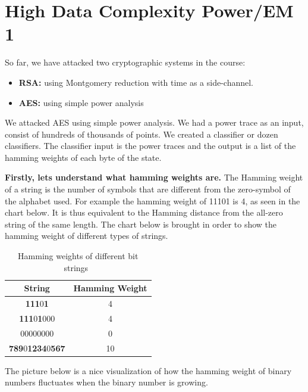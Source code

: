 \chapter{High Data Complexity Power/EM 1} \label{cha:High Data Complexity Power/EM 1}

So far, we have attacked two cryptographic systems in the course:
\begin{itemize}
    \item \textbf{RSA:} using Montgomery reduction with time as a side-channel.
    \item \textbf{AES:} using simple power analysis
\end{itemize}

We attacked AES using simple power analysis.
We had a power trace as an input, consist of hundreds of thousands of points.
We created a classifier or dozen classifiers.
The classifier input is the power traces and the output is a list of the hamming weights of each byte of the state.

\textbf{Firstly, lets understand what hamming weights are.}
The Hamming weight of a string is the number of symbols that are different from the zero-symbol of the alphabet used. For example the hamming weight of 11101 is 4, as seen in the chart below. It is thus equivalent to the Hamming distance from the all-zero string of the same length.
The chart below is brought in order to show the hamming weight of different types of strings.

\begin{table}
    \caption{Hamming weights of different bit strings~\cite{hamming}}\label{hammingWeights}
    \begin{center}
    \begin{tabular}{ cc }
        \toprule
        String & Hamming Weight \\ 
        \midrule
        \textbf{111}0\textbf{1} & 4 \\ 
        \textbf{111}0\textbf{1}000 & 4 \\
        00000000 & 0 \\
        \textbf{789}0\textbf{1234}0\textbf{567} & 10 \\
        \bottomrule
    \end{tabular}
    \end{center}
\end{table}
The picture below is a nice visualization of how the hamming weight of binary numbers fluctuates when the binary number is growing.

